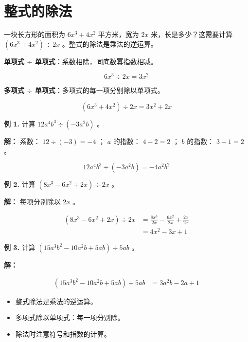 \section*{整式的除法}


\begin{explore}


一块长方形的面积为 $6x^3 + 4x^2$ 平方米，宽为 $2x$ 米，长是多少？这需要计算 $(6x^3 + 4x^2) \div 2x$ 。整式的除法是乘法的逆运算。

\end{explore}

\begin{understand}


\textbf{单项式 $\div$ 单项式}：系数相除，同底数幂指数相减。

\[
6x^3 \div 2x = 3x^2
\]


\textbf{多项式 $\div$ 单项式}：多项式的每一项分别除以单项式。

\[
(6x^3 + 4x^2) \div 2x = 3x^2 + 2x
\]


\end{understand}

\begin{workedexamples}


\textbf{例 1.} 计算 $12a^4b^3 \div (-3a^2b)$ 。

\textbf{解：} 系数： $12 \div (-3) = -4$ ； $a$ 的指数： $4 - 2 = 2$ ； $b$ 的指数： $3 - 1 = 2$ 。

\[
12a^4b^3 \div (-3a^2b) = -4a^2b^2
\]


\textbf{例 2.} 计算 $(8x^3 - 6x^2 + 2x) \div 2x$ 。

\textbf{解：} 每项分别除以 $2x$ 。

\[
\begin{aligned}
(8x^3 - 6x^2 + 2x) \div 2x &= \frac{8x^3}{2x} - \frac{6x^2}{2x} + \frac{2x}{2x} \\
&= 4x^2 - 3x + 1
\end{aligned}
\]


\textbf{例 3.} 计算 $(15a^3b^2 - 10a^2b + 5ab) \div 5ab$ 。

\textbf{解：}

\[
\begin{aligned}
(15a^3b^2 - 10a^2b + 5ab) \div 5ab &= 3a^2b - 2a + 1
\end{aligned}
\]


\end{workedexamples}

\begin{keytakeaway}


\begin{itemize}
  \item 整式除法是乘法的逆运算。
  \item 多项式除以单项式：每一项分别除。
  \item 除法时注意符号和指数的计算。
\end{itemize}


\end{keytakeaway}

